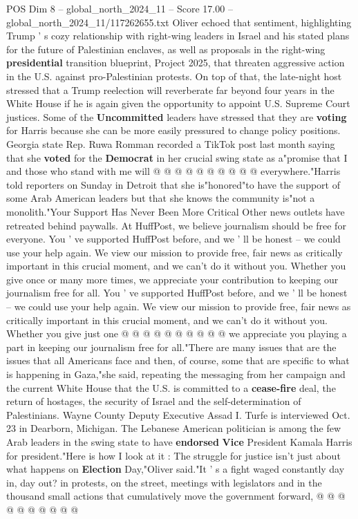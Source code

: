 \begin{textsample}{POS Dim 8 – global\_north\_2024\_11 – Score 17.00 – global\_north\_2024\_11/117262655.txt}
Oliver echoed that sentiment, highlighting Trump ' s cozy relationship with right-wing leaders in Israel and his stated plans for the future of Palestinian enclaves, as well as proposals in the right-wing \textbf{presidential} transition blueprint, Project 2025, that threaten aggressive action in the U.S. against pro-Palestinian protests.
On top of that, the late-night host stressed that a Trump reelection will reverberate far beyond four years in the White House if he is again given the opportunity to appoint U.S.
Supreme Court justices.
Some of the \textbf{Uncommitted} leaders have stressed that they are \textbf{voting} for Harris because she can be more easily pressured to change policy positions.
Georgia state Rep.
Ruwa Romman recorded a TikTok post last month saying that she \textbf{voted} for the \textbf{Democrat} in her crucial swing state as a"promise that I and those who stand with me will @ @ @ @ @ @ @ @ @ @ everywhere."Harris told reporters on Sunday in Detroit that she is"honored"to have the support of some Arab American leaders but that she knows the community is"not a monolith."Your Support Has Never Been More Critical Other news outlets have retreated behind paywalls.
At HuffPost, we believe journalism should be free for everyone.
You ' ve supported HuffPost before, and we ' ll be honest -- we could use your help again.
We view our mission to provide free, fair news as critically important in this crucial moment, and we can't do it without you.
Whether you give once or many more times, we appreciate your contribution to keeping our journalism free for all.
You ' ve supported HuffPost before, and we ' ll be honest -- we could use your help again.
We view our mission to provide free, fair news as critically important in this crucial moment, and we can't do it without you.
Whether you give just one @ @ @ @ @ @ @ @ @ @ we appreciate you playing a part in keeping our journalism free for all."There are many issues that are the issues that all Americans face and then, of course, some that are specific to what is happening in Gaza,"she said, repeating the messaging from her campaign and the current White House that the U.S. is committed to a \textbf{cease-fire} deal, the return of hostages, the security of Israel and the self-determination of Palestinians.
Wayne County Deputy Executive Assad I.
Turfe is interviewed Oct. 23 in Dearborn, Michigan.
The Lebanese American politician is among the few Arab leaders in the swing state to have \textbf{endorsed} \textbf{Vice} President Kamala Harris for president."Here is how I look at it : The struggle for justice isn't just about what happens on \textbf{Election} Day,"Oliver said."It ' s a fight waged constantly day in, day out? in protests, on the street, meetings with legislators and in the thousand small actions that cumulatively move the government forward, @ @ @ @ @ @ @ @ @ @

\end{textsample}
